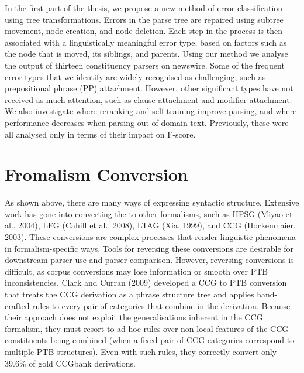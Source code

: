 In the first part of the thesis, we propose a new method of error classification using tree transformations.
Errors in the parse tree are repaired using subtree movement, node creation, and node deletion.
Each step in the process is then associated with a linguistically meaningful error type, based on factors such as the node that is moved, its siblings, and parents.  
Using our method we analyse the output of thirteen constituency parsers on newswire.
Some of the frequent error types that we identify are widely recognised as challenging, such as prepositional phrase (PP) attachment.
However, other significant types have not received as much attention, such as clause attachment and modifier attachment.
We also investigate where reranking and self-training improve parsing, and where performance decreases when parsing out-of-domain text.
Previously, these were all analysed only in terms of their impact on F-score.

\section{Fromalism Conversion}

As shown above, there are many ways of expressing syntactic structure.
Extensive work has gone into converting the \ptb to other formalisms, such as HPSG (Miyao et al., 2004), LFG (Cahill et al., 2008), LTAG (Xia, 1999), and CCG (Hockenmaier, 2003).
These conversions are complex processes that render linguistic phenomena in formalism-specific ways.
Tools for reversing these conversions are desirable for downstream parser use and parser comparison.
However, reversing conversions is difficult, as corpus conversions may lose information or smooth over PTB inconsistencies.
Clark and Curran (2009) developed a CCG to PTB conversion that treats the CCG derivation as a phrase structure tree and applies hand-crafted rules to every pair of categories that combine in the derivation.
Because their approach does not exploit the generalisations inherent in the CCG formalism, they must resort to ad-hoc rules over non-local features of the CCG constituents being combined (when a fixed pair of CCG categories correspond to multiple PTB structures).
Even with such rules, they correctly convert only 39.6\% of gold CCGbank derivations.

